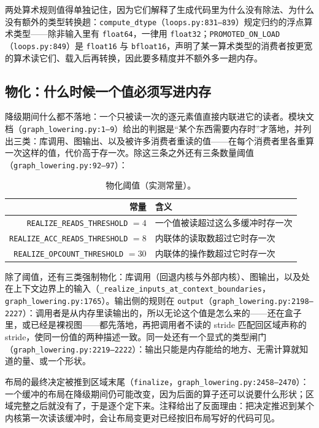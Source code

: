 两处算术规则值得单独记住，因为它们解释了生成代码里为什么没有除法、为什么没有额外的类型转换趟：\texttt{compute\_dtype}（\texttt{loops.py:831--839}）规定归约的浮点算术类型——除非输入里有 \texttt{float64}，一律用 \texttt{float32}；\texttt{PROMOTED\_ON\_LOAD}（\texttt{loops.py:849}）是 \texttt{float16} 与 \texttt{bfloat16}，声明了某一算术类型的消费者按更宽的算术读它们、载入后再转换，因此要多精度并不额外多一趟内存。

\subsection{物化：什么时候一个值必须写进内存}

降级期间什么都不落地：一个只被读一次的逐元素值直接内联进它的读者。模块文档（\texttt{graph\_lowering.py:1--9}）给出的判据是“某个东西需要内存时”才落地，并列出三类：库调用、图输出、以及被许多消费者重读的值——在每个消费者里各重算一次这样的值，代价高于存一次。除这三条之外还有三条数量阈值（\texttt{graph\_lowering.py:92--97}）：

\begin{table}[H]
\centering
\caption{物化阈值（实测常量）。}
\label{tab:be:realize}
\small
\begin{tabular}{rl}
\toprule
常量 & 含义 \\
\midrule
\texttt{REALIZE\_READS\_THRESHOLD} $= 4$ & 一个值被读超过这么多缓冲时存一次 \\
\texttt{REALIZE\_ACC\_READS\_THRESHOLD} $= 8$ & 内联体的读取数超过它时存一次 \\
\texttt{REALIZE\_OPCOUNT\_THRESHOLD} $= 30$ & 内联体的操作数超过它时存一次 \\
\bottomrule
\end{tabular}
\end{table}

除了阈值，还有三类强制物化：库调用（回退内核与外部内核）、图输出，以及处在上下文边界上的输入（\texttt{\_realize\_inputs\_at\_context\_boundaries}，\texttt{graph\_lowering.py:1765}）。输出侧的规则在 \texttt{output}（\texttt{graph\_lowering.py:2198--2227}）：调用者是从内存里读输出的，所以无论这个值是怎么来的——还在盒子里，或已经是裸视图——都先落地，再把调用者不读的 stride 匹配回区域声称的 stride，使同一份值的两种描述一致。同一处还有一个显式的类型闸门（\texttt{graph\_lowering.py:2219--2222}）：输出只能是内存能给的地方、无需计算就知道的量、或一个形状。

布局的最终决定被推到区域末尾（\texttt{finalize}，\texttt{graph\_lowering.py:2458--2470}）：一个缓冲的布局在降级期间仍可能改变，因为后面的算子还可以说要什么形状；区域完整之后就没有了，于是逐个定下来。注释给出了反面理由：把决定推迟到某个内核第一次读该缓冲时，会让布局变更对已经按旧布局写好的代码可见。

